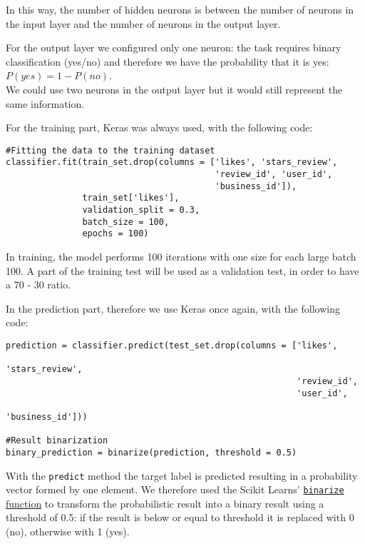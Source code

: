 In this way, the number of hidden neurons is between the number of neurons in the input layer and the number of neurons in the output layer.

For the output layer we configured only one neuron: the task requires binary classification (yes/no) and therefore we have the probability that it is yes: $P(yes) = 1 - P(no)$.\\
We could use two neurons in the output layer but it would still represent the same information.

For the training part, Keras was always used, with the following code:

\begin{lstlisting}[caption={Neural Network training},label={lst:nn-fit}]
#Fitting the data to the training dataset
classifier.fit(train_set.drop(columns = ['likes', 'stars_review', 
                                         'review_id', 'user_id', 
                                         'business_id']), 
               train_set['likes'], 
               validation_split = 0.3, 
               batch_size = 100, 
               epochs = 100)
\end{lstlisting}

In training, the model performs 100 iterations with one size for each large batch 100. A part of the training test will be used as a validation test, in order to have a 70 - 30 ratio.

In the prediction part, therefore we use Keras once again, with the following code:

\begin{lstlisting}[caption={Neural Network predictions},label={lst:nn-pred}]
prediction = classifier.predict(test_set.drop(columns = ['likes', 
                                                         'stars_review',
                                                         'review_id',
                                                         'user_id',
                                                         'business_id']))

#Result binarization
binary_prediction = binarize(prediction, threshold = 0.5)
\end{lstlisting}

With the \texttt{predict} method the target label is predicted resulting in a probability vector formed by one element. We therefore used the Scikit Learns' \href{https://scikit-learn.org/stable/modules/generated/sklearn.preprocessing.binarize.html}{\texttt{binarize} function} to transform the probabilistic result into a binary result using a threshold of 0.5: if the result is below or equal to threshold it is replaced with 0 (no), otherwise with 1 (yes).


